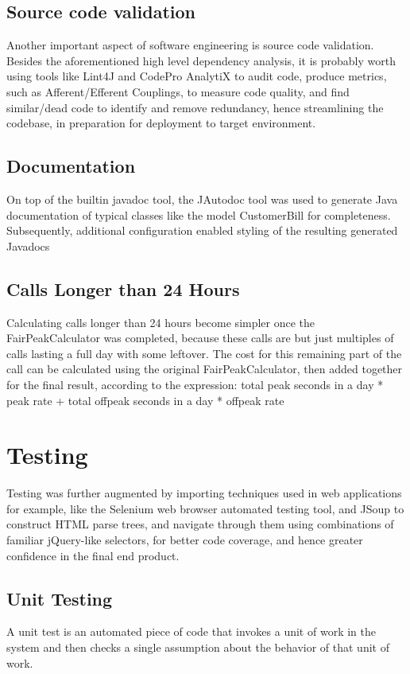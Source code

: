 \documentclass[11pt,twocolumn]{article} %
\begin{document}
\subsection{Source code validation}
Another important aspect of software engineering is source code validation. Besides the
aforementioned high level dependency analysis, it is probably worth using tools like Lint4J
and CodePro AnalytiX to audit code, produce metrics, such as Afferent/Efferent Couplings, to measure code quality, and find similar/dead code to identify and remove redundancy, hence streamlining the codebase, in preparation for deployment to target environment.

\subsection{Documentation}
On top of the builtin javadoc tool, the JAutodoc tool was used to generate Java documentation of typical classes like the model CustomerBill for completeness.
Subsequently, additional configuration enabled styling of the resulting generated Javadocs

\subsection{Calls Longer than 24 Hours}
Calculating calls longer than 24 hours become simpler once the FairPeakCalculator was
completed, because these calls are but just multiples of calls lasting a full day with some
leftover. The cost for this remaining part of the call can be calculated using the original
FairPeakCalculator, then added together for the final result, according to the expression:
total peak seconds in a day * peak rate + total offpeak seconds in a day * offpeak rate

\section{Testing}
Testing was further augmented by importing techniques used in web applications for example, like the Selenium web browser automated testing tool, and JSoup to construct
HTML parse trees, and navigate through them using combinations of familiar jQuery-like
selectors, for better code coverage, and hence greater confidence in the final end product.

\subsection{Unit Testing}
A unit test is an automated piece of code that invokes a unit of work in the system and then checks a single assumption about
the behavior of that unit of work.\cite{JUnit} 
\end{document}
